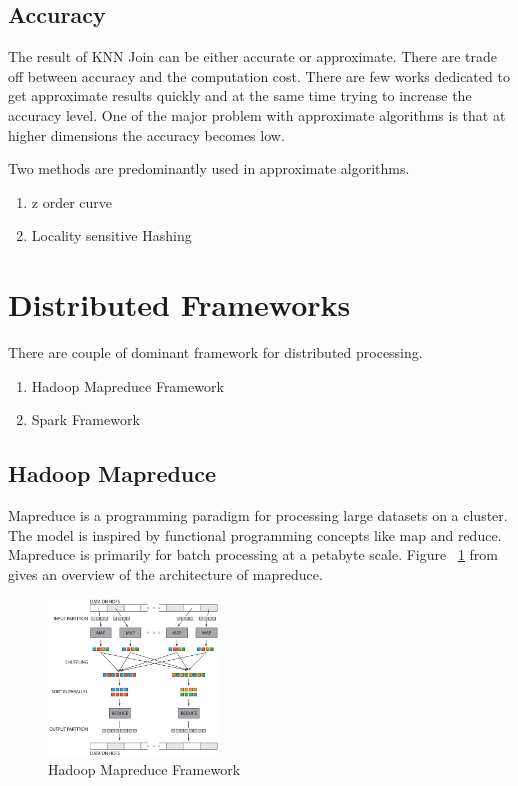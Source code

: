 \documentclass[conference]{IEEEtran}
\begin{document}
\subsection{Accuracy}
The result of KNN Join can be either accurate or approximate. There
are trade off between accuracy and the computation cost. There are few
works dedicated to get approximate results quickly \cite{stupar_rankreduceprocessing_2010}
\cite{zhang_efficient_2012} and at the same time trying to increase the accuracy
level. One of the major problem with approximate algorithms is that at higher
dimensions the accuracy becomes low.

Two methods are predominantly
used in approximate algorithms.
\begin{enumerate}
\item z order curve
\item Locality sensitive Hashing
\end{enumerate}

\bigskip

\section{Distributed Frameworks}

There are couple of dominant framework for distributed processing.
\begin{enumerate}
\item Hadoop Mapreduce Framework \cite{_hadoop_mr}
\item Spark Framework \cite{_apache_spark}
\end{enumerate}

\subsection{Hadoop Mapreduce}
Mapreduce is a programming paradigm for processing large datasets on a
cluster. The model is inspired by functional programming concepts like
map and reduce. Mapreduce is primarily for batch processing at a
petabyte scale. Figure ~\ref{fig:hadooparch} from \cite{_hadoop_mr_arch} gives an overview of the architecture of
mapreduce.

\begin{figure}[here]
\includegraphics[width=0.4\textwidth]{hadooparch.jpg}
\caption{Hadoop Mapreduce Framework}
\label{fig:hadooparch}
\end{figure}
\end{document}
